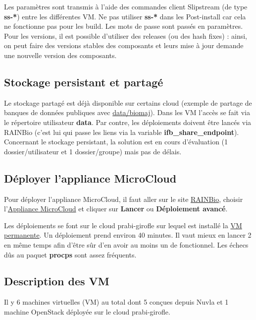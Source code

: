 Les paramètres sont transmis à l'aide des commandes client Slipstream (de type \textbf{ss-*}) entre les différentes VM. Ne pas utiliser \textbf{ss-*} dans les Post-install car cela ne fonctionne pas pour les build. Les mots de passe sont passés en paramètres.
Pour les versions, il est possible d'utiliser des releases (ou des hash fixes) : ainsi, on peut faire des versions stables des composants et leurs mise à jour demande une nouvelle version des composants.

\subsection{Stockage persistant et partagé}

Le stockage partagé est déjà disponible sur certains cloud (exemple de partage de banques de données publiques avec \href{https://biosphere.france-bioinformatique.fr/data/biomaj}{data/biomaj}). Dans les VM l'accès se fait via le répertoire utilisateur \textbf{data}. Par contre, les déploiements doivent être lancés via RAINBio (c’est lui qui passe les liens via la variable \textbf{ifb\_share\_endpoint}).
Concernant le stockage persistant, la solution est en cours d’évaluation (1 dossier/utilisateur et 1 dossier/groupe) mais pas de délais.

\subsection{Déployer l'appliance MicroCloud}

Pour déployer l'appliance MicroCloud, il faut aller sur le site  \href{https://biosphere.france-bioinformatique.fr/catalogue/}{RAINBio}, choisir l’\href{https://biosphere.france-bioinformatique.fr/catalogue/appliance/150/}{Appliance MicroCloud} et cliquer sur \textbf{Lancer} ou \textbf{Déploiement avancé}.

Les déploiements se font sur le cloud prabi-girofle sur lequel est installé la \hyperref[VM permanente]{VM permanente}. Un déploiement prend environ 40 minutes. Il vaut mieux en lancer 2 en même temps afin d'être sûr d'en avoir au moins un de fonctionnel.
Les échecs dûs au paquet \textbf{procps} sont assez fréquents.

\subsection {Description des VM}

Il y 6 machines virtuelles (VM) au total dont 5 conçues depuis Nuvla et 1 machine OpenStack déployée sur le cloud prabi-girofle.

